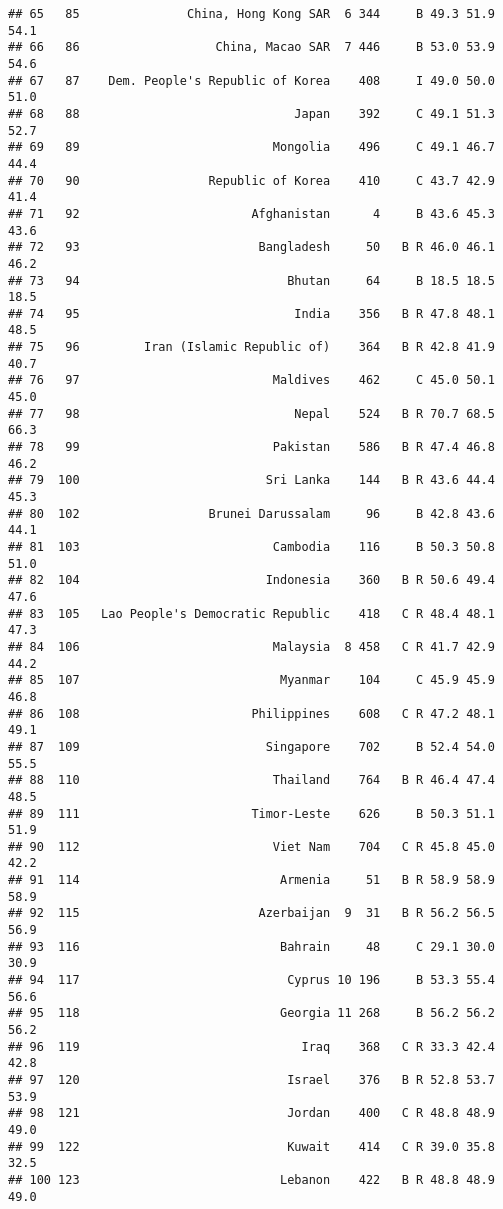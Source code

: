 \documentclass[]{article}
\begin{document}
\begin{verbatim}
## 65   85               China, Hong Kong SAR  6 344     B 49.3 51.9 54.1
## 66   86                   China, Macao SAR  7 446     B 53.0 53.9 54.6
## 67   87    Dem. People's Republic of Korea    408     I 49.0 50.0 51.0
## 68   88                              Japan    392     C 49.1 51.3 52.7
## 69   89                           Mongolia    496     C 49.1 46.7 44.4
## 70   90                  Republic of Korea    410     C 43.7 42.9 41.4
## 71   92                        Afghanistan      4     B 43.6 45.3 43.6
## 72   93                         Bangladesh     50   B R 46.0 46.1 46.2
## 73   94                             Bhutan     64     B 18.5 18.5 18.5
## 74   95                              India    356   B R 47.8 48.1 48.5
## 75   96         Iran (Islamic Republic of)    364   B R 42.8 41.9 40.7
## 76   97                           Maldives    462     C 45.0 50.1 45.0
## 77   98                              Nepal    524   B R 70.7 68.5 66.3
## 78   99                           Pakistan    586   B R 47.4 46.8 46.2
## 79  100                          Sri Lanka    144   B R 43.6 44.4 45.3
## 80  102                  Brunei Darussalam     96     B 42.8 43.6 44.1
## 81  103                           Cambodia    116     B 50.3 50.8 51.0
## 82  104                          Indonesia    360   B R 50.6 49.4 47.6
## 83  105   Lao People's Democratic Republic    418   C R 48.4 48.1 47.3
## 84  106                           Malaysia  8 458   C R 41.7 42.9 44.2
## 85  107                            Myanmar    104     C 45.9 45.9 46.8
## 86  108                        Philippines    608   C R 47.2 48.1 49.1
## 87  109                          Singapore    702     B 52.4 54.0 55.5
## 88  110                           Thailand    764   B R 46.4 47.4 48.5
## 89  111                        Timor-Leste    626     B 50.3 51.1 51.9
## 90  112                           Viet Nam    704   C R 45.8 45.0 42.2
## 91  114                            Armenia     51   B R 58.9 58.9 58.9
## 92  115                         Azerbaijan  9  31   B R 56.2 56.5 56.9
## 93  116                            Bahrain     48     C 29.1 30.0 30.9
## 94  117                             Cyprus 10 196     B 53.3 55.4 56.6
## 95  118                            Georgia 11 268     B 56.2 56.2 56.2
## 96  119                               Iraq    368   C R 33.3 42.4 42.8
## 97  120                             Israel    376   B R 52.8 53.7 53.9
## 98  121                             Jordan    400   C R 48.8 48.9 49.0
## 99  122                             Kuwait    414   C R 39.0 35.8 32.5
## 100 123                            Lebanon    422   B R 48.8 48.9 49.0

\end{verbatim}
\end{document}
